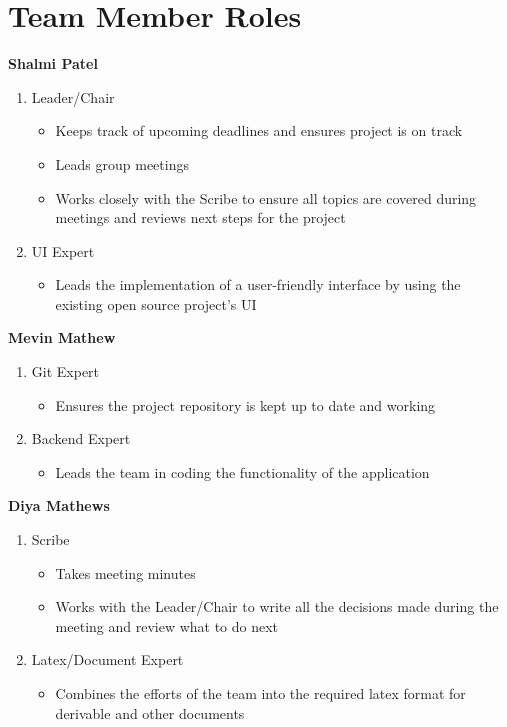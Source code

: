 \documentclass{article}
\begin{document}
\section{Team Member Roles}
\textbf{Shalmi Patel}
\begin{enumerate}
  \item Leader/Chair
  \begin{itemize}
    \item Keeps track of upcoming deadlines and ensures project is on track
    \item Leads group meetings
    \item Works closely with the Scribe to ensure all topics are covered during meetings and reviews next steps for the project
  \end{itemize}
  \item UI Expert
  \begin{itemize}
    \item Leads the implementation of a user-friendly interface by using the existing open source project’s UI
  \end{itemize}
\end{enumerate} 

\vspace{5mm}

\textbf{Mevin Mathew}
\begin{enumerate}
  \item Git Expert
  \begin{itemize}
    \item Ensures the project repository is kept up to date and working
  \end{itemize}
  \item Backend Expert
  \begin{itemize}
    \item Leads the team in coding the functionality of the application
  \end{itemize}
\end{enumerate}

\vspace{5mm}

\textbf{Diya Mathews}
\begin{enumerate}
  \item Scribe
  \begin{itemize}
    \item Takes meeting minutes
    \item Works with the Leader/Chair to write all the decisions made during the meeting and review what to do next
  \end{itemize}
  \item Latex/Document Expert
  \begin{itemize}
    \item Combines the efforts of the team into the required latex format for derivable and other documents
  \end{itemize}
\end{enumerate}
\end{document}
